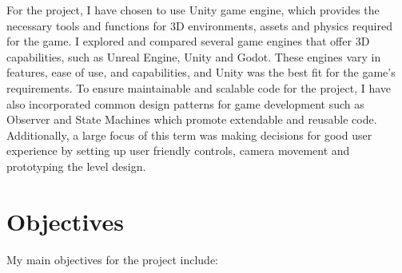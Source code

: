 \documentclass[]{final_report}
\begin{document}
For the project, I have chosen to use Unity game engine, which provides the necessary tools and functions for 3D environments, assets and physics required for the game. I explored and compared several game engines that offer 3D capabilities, such as Unreal Engine, Unity and Godot. These engines vary in features, ease of use, and capabilities, and Unity was the best fit for the game's requirements. To ensure maintainable and scalable code for the project, I have also incorporated common design patterns for game development such as Observer and State Machines which promote extendable and reusable code. Additionally, a large focus of this term was making decisions for good user experience by setting up user friendly controls, camera movement and prototyping the level design.
\section{Objectives}
My main objectives for the project include:
\end{document}
